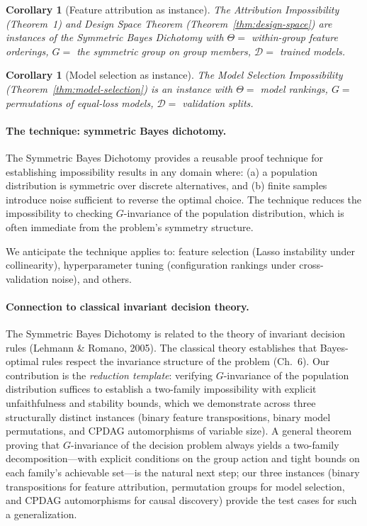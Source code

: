 \documentclass{article}
\newtheorem{corollary}[theorem]{Corollary}
\begin{document}
\begin{corollary}[Feature attribution as instance]
\label{cor:attribution-instance}
The Attribution Impossibility (Theorem~1) and Design Space Theorem
(Theorem~\ref{thm:design-space}) are instances of the Symmetric
Bayes Dichotomy with $\Theta =$ within-group feature orderings,
$G =$ the symmetric group on group members,
$\mathcal{D} =$ trained models.
\end{corollary}

\begin{corollary}[Model selection as instance]
\label{cor:model-selection-instance}
The Model Selection Impossibility
(Theorem~\ref{thm:model-selection}) is an instance with
$\Theta =$ model rankings, $G =$ permutations of equal-loss models,
$\mathcal{D} =$ validation splits.
\end{corollary}

\paragraph{The technique: symmetric Bayes dichotomy.}
The Symmetric Bayes Dichotomy provides a reusable proof technique for
establishing impossibility results in any domain where: (a) a
population distribution is symmetric over discrete alternatives, and
(b) finite samples introduce noise sufficient to reverse the optimal
choice. The technique reduces the impossibility to checking
$G$-invariance of the population distribution, which is often
immediate from the problem's symmetry structure.

We anticipate the technique applies to: feature selection (Lasso
instability under collinearity), hyperparameter tuning (configuration
rankings under cross-validation noise), and others.

\paragraph{Connection to classical invariant decision theory.}
The Symmetric Bayes Dichotomy is related to the theory of invariant
decision rules (Lehmann \& Romano, 2005). The classical theory
establishes that Bayes-optimal rules respect the invariance structure
of the problem (Ch.~6). Our contribution is the \emph{reduction template}:
verifying $G$-invariance of the population distribution suffices to
establish a two-family impossibility with explicit unfaithfulness
and stability bounds, which we demonstrate across three structurally
distinct instances (binary feature transpositions, binary model
permutations, and CPDAG automorphisms of variable size).
A general theorem proving that $G$-invariance of the decision problem always yields a two-family decomposition---with explicit conditions on the group action and tight bounds on each family's achievable set---is the natural next step; our three instances (binary transpositions for feature attribution, permutation groups for model selection, and CPDAG automorphisms for causal discovery) provide the test cases for such a generalization.
\end{document}
